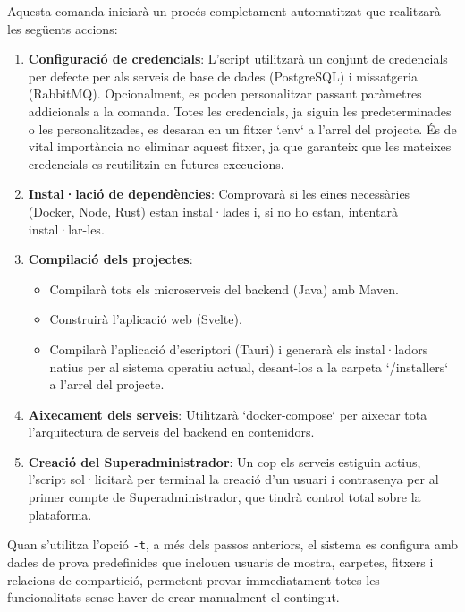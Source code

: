 Aquesta comanda iniciarà un procés completament automatitzat que realitzarà les següents accions:
\begin{enumerate}
    \item \textbf{Configuració de credencials}: L'script utilitzarà un conjunt de credencials per defecte per als serveis de base de dades (PostgreSQL) i missatgeria (RabbitMQ). Opcionalment, es poden personalitzar passant paràmetres addicionals a la comanda. Totes les credencials, ja siguin les predeterminades o les personalitzades, es desaran en un fitxer `.env` a l'arrel del projecte. És de vital importància no eliminar aquest fitxer, ja que garanteix que les mateixes credencials es reutilitzin en futures execucions.
    
    \item \textbf{Instal·lació de dependències}: Comprovarà si les eines necessàries (Docker, Node, Rust) estan instal·lades i, si no ho estan, intentarà instal·lar-les.
    
    \item \textbf{Compilació dels projectes}:
    \begin{itemize}
        \item Compilarà tots els microserveis del backend (Java) amb Maven.
        \item Construirà l'aplicació web (Svelte).
        \item Compilarà l'aplicació d'escriptori (Tauri) i generarà els instal·ladors natius per al sistema operatiu actual, desant-los a la carpeta `/installers` a l'arrel del projecte.
    \end{itemize}

    \item \textbf{Aixecament dels serveis}: Utilitzarà `docker-compose` per aixecar tota l'arquitectura de serveis del backend en contenidors.

    \item \textbf{Creació del Superadministrador}: Un cop els serveis estiguin actius, l'script sol·licitarà per terminal la creació d'un usuari i contrasenya per al primer compte de Superadministrador, que tindrà control total sobre la plataforma.
\end{enumerate}

Quan s'utilitza l'opció \texttt{-t}, a més dels passos anteriors, el sistema es configura amb dades de prova predefinides que inclouen usuaris de mostra, carpetes, fitxers i relacions de compartició, permetent provar immediatament totes les funcionalitats sense haver de crear manualment el contingut.

